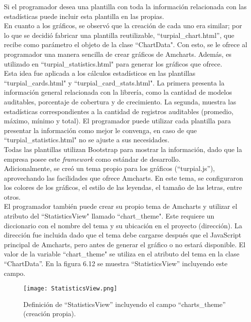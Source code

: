 Si el programador desea una plantilla con toda la información relacionada con las estadísticas puede incluir esta plantilla en las propias.\\

En cuanto a los gráficos, se observó que la creación de cada uno era similar; por lo que se decidió fabricar una plantilla reutilizable, “turpial\_chart.html”, que recibe como parámetro el objeto de la clase “ChartData". Con esto, se le ofrece al programador una manera sencilla de crear gráficos de Amcharts. Además, es utilizado en “turpial\_statistics.html" para generar los gráficos que ofrece. \\

Esta idea fue aplicada a los cálculos estadísticos en las plantillas “turpial\_cards.html" y “turpial\_card\_stats.html". La primera presenta  la información general relacionada con la librería, como la cantidad de modelos auditables, porcentaje de cobertura y de crecimiento. La segunda, muestra las estadísticas correspondientes a la cantidad de registros auditables (promedio, máximo, mínimo y total). El programador puede utilizar cada plantilla para presentar la información como mejor le convenga, en caso de que “turpial\_statistics.html" no se ajuste a sus necesidades.\\

Todas las plantillas utilizan Bootstrap para mostrar la información, dado que la empresa posee este \textit{framework} como estándar de desarrollo.\\

Adicionalmente, se creó un tema propio para los gráficos (“turpial.js”), aprovechando las facilidades que ofrece Amcharts. En este tema, se configuraron los colores de los gráficos, el estilo de las leyendas, el tamaño de las letras, entre otros.\\

El programador también puede crear su propio tema de Amcharts y utilizar el atributo del “StatisticsView" llamado “chart\_theme". Este requiere un diccionario con el nombre del tema y su ubicación en el proyecto (dirección). La dirección fue incluida dado que el tema debe cargarse después que el JavaScript principal de Amcharts, pero antes de generar el gráfico o no estará disponible. El valor de la variable “chart\_theme" se utiliza en el atributo del tema en la clase “ChartData”. En la figura 6.12 se muestra “StatisticsView” incluyendo este campo.\\

\begin{figure}[h]
\centering
\texttt{[image: StatisticsView.png]}
\caption{ Definición de “StatisticsView”  incluyendo el campo “charts\_theme” (creación propia).}
\label{fig:figura6.12}
\end{figure}

